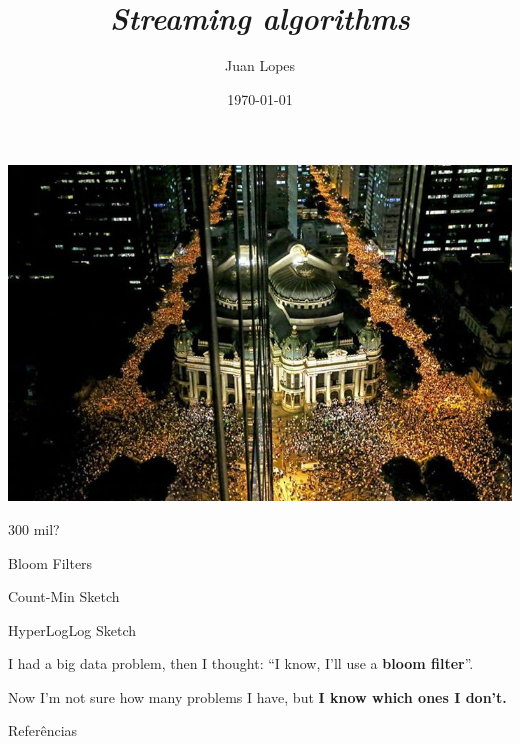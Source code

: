 \documentclass[14pt]{beamer}
\title{\emph{Streaming algorithms}}
\author{Juan Lopes}
\date{\today}
\begin{document}
\begin{frame}
    \maketitle
\end{frame}

\begin{frame}
    \includegraphics[scale=0.4]{figures/riobranco.jpg}

    \smallskip
    
     300 mil?
\end{frame}

\begin{frame}
    Bloom Filters \\ {\tiny\cite{bloom1970space}}

    \bigskip

    Count-Min Sketch \\ {\tiny\cite{cormode2004improved}}
    
    \bigskip
    
    HyperLogLog Sketch \\ {\tiny\cite{flajolet2008hyperloglog}}
\end{frame}

\begin{frame}
I had a big data problem, then I thought: ``I know, I'll use a {\bf bloom filter}''. 

\bigskip

Now I'm not sure how many problems I have, but {\bf I know which ones I don't.}
\end{frame}




\begin{frame}{Referências}
\fontsize{8}{2}


\end{frame}
\end{document}
